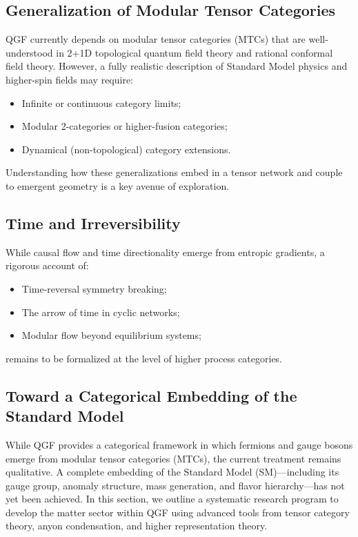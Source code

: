 \documentclass[11pt]{article}
\begin{document}
\subsection{Generalization of Modular Tensor Categories}

QGF currently depends on modular tensor categories (MTCs) that are well-understood in 2+1D topological quantum field theory and rational conformal field theory. However, a fully realistic description of Standard Model physics and higher-spin fields may require:
\begin{itemize}
    \item Infinite or continuous category limits;
    \item Modular 2-categories or higher-fusion categories;
    \item Dynamical (non-topological) category extensions.
\end{itemize}

Understanding how these generalizations embed in a tensor network and couple to emergent geometry is a key avenue of exploration.

\subsection{Time and Irreversibility}

While causal flow and time directionality emerge from entropic gradients, a rigorous account of:
\begin{itemize}
    \item Time-reversal symmetry breaking;
    \item The arrow of time in cyclic networks;
    \item Modular flow beyond equilibrium systems;
\end{itemize}
remains to be formalized at the level of higher process categories.

\subsection{Toward a Categorical Embedding of the Standard Model} \label{sec:sm_embedding}

While QGF provides a categorical framework in which fermions and gauge bosons emerge from modular tensor categories (MTCs), the current treatment remains qualitative. A complete embedding of the Standard Model (SM)—including its gauge group, anomaly structure, mass generation, and flavor hierarchy—has not yet been achieved. In this section, we outline a systematic research program to develop the matter sector within QGF using advanced tools from tensor category theory, anyon condensation, and higher representation theory.
\end{document}
